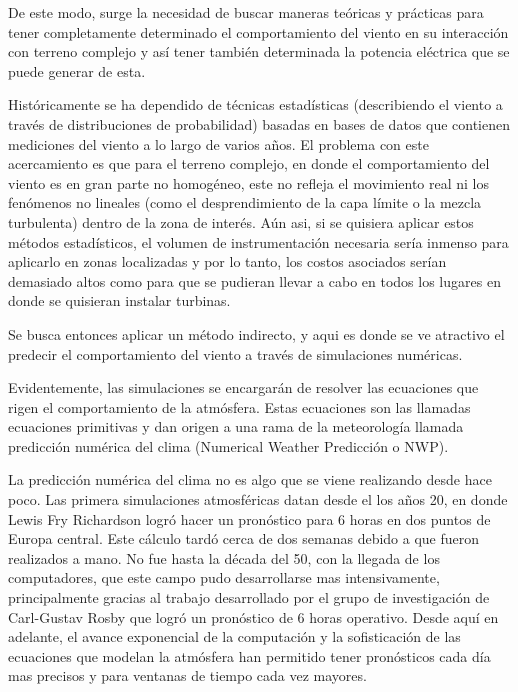 De este modo, surge la necesidad de buscar maneras teóricas y prácticas para tener completamente determinado el comportamiento del viento en su interacción con terreno complejo y así tener también determinada la potencia eléctrica que se puede generar de esta.

Históricamente se ha dependido de técnicas estadísticas (describiendo el viento a través de distribuciones de probabilidad) basadas en bases de datos que contienen mediciones del viento a lo largo de varios años. El problema con este acercamiento es que para el terreno complejo, en donde el comportamiento del viento es en gran parte no homogéneo, este no refleja el movimiento real ni los fenómenos no lineales (como el desprendimiento de la capa límite o la mezcla turbulenta) dentro de la zona de interés. Aún asi, si se quisiera aplicar estos métodos estadísticos, el volumen de instrumentación necesaria sería inmenso para aplicarlo en zonas localizadas y por lo tanto, los costos asociados serían demasiado altos como para que se pudieran llevar a cabo en todos los lugares en donde se quisieran instalar turbinas.

Se busca entonces aplicar un método indirecto, y aqui es donde se ve atractivo el predecir el comportamiento del viento a través de simulaciones numéricas. 

Evidentemente, las simulaciones se encargarán de resolver las ecuaciones que rigen el comportamiento de la atmósfera. Estas ecuaciones son las llamadas ecuaciones primitivas y dan origen a una rama de la meteorología llamada predicción numérica del clima (Numerical Weather Predicción o NWP).

La predicción numérica del clima no es algo que se viene realizando desde hace poco. Las primera simulaciones atmosféricas datan desde el los años 20, en donde Lewis Fry Richardson logró hacer un pronóstico para 6 horas en dos puntos de Europa central. Este cálculo tardó cerca de dos semanas debido a que fueron realizados a mano. No fue hasta la década del 50, con la llegada de los computadores, que este campo pudo desarrollarse mas intensivamente, principalmente gracias al trabajo desarrollado por el grupo de investigación de Carl-Gustav Rosby que logró un pronóstico de 6 horas operativo. Desde aquí en adelante, el avance exponencial de la computación y la sofisticación de las ecuaciones que modelan la atmósfera han permitido tener pronósticos cada día mas precisos y para ventanas de tiempo cada vez mayores. 


